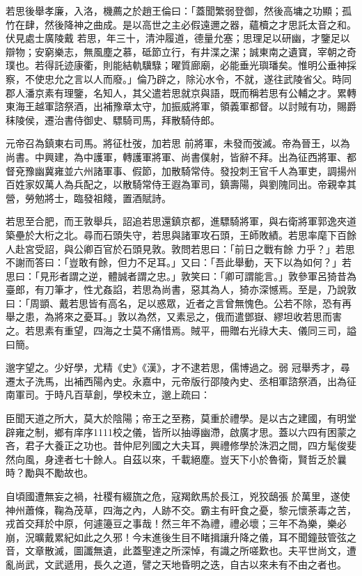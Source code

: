 \begin{pinyinscope}
 若思後舉孝廉，入洛，機薦之於趙王倫曰：「蓋聞繁弱登御，然後高墉之功顯；孤竹在肆，然後降神之曲成。是以高世之主必假遠邇之器，蘊櫝之才思託太音之和。伏見處士廣陵戴
 若思，年三十，清沖履道，德量允塞；思理足以研幽，才鑒足以辯物；安窮樂志，無風塵之慕，砥節立行，有井渫之潔；誠東南之遺寶，宰朝之奇璞也。若得託迹康衢，則能結軌驥騄；曜質廊廟，必能垂光璵璠矣。惟明公垂神採察，不使忠允之言以人而廢。」倫乃辟之，除沁水令，不就，遂往武陵省父。時同郡人潘京素有理鑒，名知人，其父遣若思就京與語，既而稱若思有公輔之才。累轉東海王越軍諮祭酒，出補豫章太守，加振威將軍，領義軍都督。以討賊有功，賜爵秣陵侯，遷治書侍御史、驃騎司馬，拜散騎侍郎。



 元帝召為鎮東右司馬。將征杜弢，加若思
 前將軍，未發而弢滅。帝為晉王，以為尚書。中興建，為中護軍，轉護軍將軍、尚書僕射，皆辭不拜。出為征西將軍、都督兗豫幽冀雍並六州諸軍事、假節，加散騎常侍。發投刺王官千人為軍吏，調揚州百姓家奴萬人為兵配之，以散騎常侍王遐為軍司，鎮壽陽，與劉隗同出。帝親幸其營，勞勉將士，臨發祖餞，置酒賦詩。



 若思至合肥，而王敦舉兵，詔追若思還鎮京都，進驃騎將軍，與右衛將軍郭逸夾道築壘於大桁之北。尋而石頭失守，若思與諸軍攻石頭，王師敗績。若思率麾下百餘人赴宮受詔，與公卿百官於石頭見敦。敦問若思曰：「前日之戰有餘
 力乎？」若思不謝而答曰：「豈敢有餘，但力不足耳。」又曰：「吾此舉動，天下以為如何？」若思曰：「見形者謂之逆，體誠者謂之忠。」敦笑曰：「卿可謂能言。」敦參軍呂猗昔為臺郎，有刀筆才，性尤姦諂，若思為尚書，惡其為人，猗亦深憾焉。至是，乃說敦曰：「周顗、戴若思皆有高名，足以惑眾，近者之言曾無愧色。公若不除，恐有再舉之患，為將來之憂耳。」敦以為然，又素忌之，俄而遣鄧嶽、繆坦收若思而害之。若思素有重望，四海之士莫不痛惜焉。賊平，冊贈右光祿大夫、儀同三司，謚曰簡。



 邈字望之。少好學，尤精《史》《漢》，才不逮若思，儒博過之。弱
 冠舉秀才，尋遷太子洗馬，出補西陽內史。永嘉中，元帝版行邵陵內史、丞相軍諮祭酒，出為征南軍司。于時凡百草創，學校未立，邈上疏曰：



 臣聞天道之所大，莫大於陰陽；帝王之至務，莫重於禮學。是以古之建國，有明堂辟雍之制，鄉有庠序1111校之儀，皆所以抽導幽滯，啟廣才思。蓋以六四有困蒙之吝，君子大養正之功也。昔仲尼列國之大夫耳，興禮修學於洙泗之間，四方髦俊斐然向風，身達者七十餘人。自茲以來，千載絕塵。豈天下小於魯衛，賢哲乏於曩時？勵與不勵故也。



 自頃國遭無妄之禍，社稷有綴旒之危，寇羯飲馬於長江，兇狡鴟張
 於萬里，遂使神州蕭條，鞠為茂草，四海之內，人跡不交。霸主有旰食之憂，黎元懷荼毒之苦，戎首交拜於中原，何遽籩豆之事哉！然三年不為禮，禮必壞；三年不為樂，樂必崩，況曠戴累紀如此之久邪！今末進後生目不睹揖讓升降之儀，耳不聞鐘鼓管弦之音，文章散滅，圖讖無遺，此蓋聖達之所深悼，有識之所嗟歎也。夫平世尚文，遭亂尚武，文武遞用，長久之道，譬之天地昏明之迭，自古以來未有不由之者也。




\end{pinyinscope}
